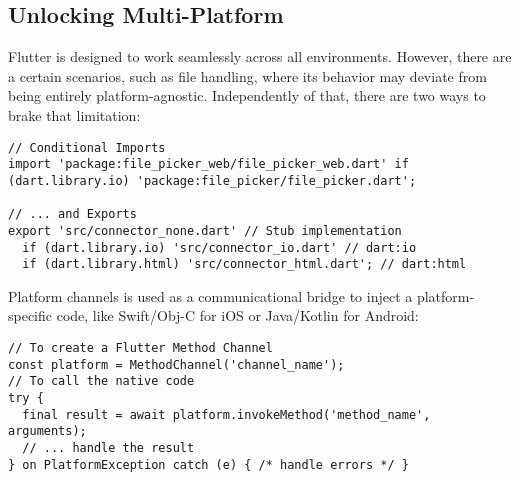 
\newpage
\subsection{Unlocking Multi-Platform}

Flutter is designed to work seamlessly across all environments. However, there are a certain scenarios, such as file
handling, where its behavior may deviate from being entirely platform-agnostic. Independently of that, there are two
ways to brake that limitation:

\begin{lstlisting}
// Conditional Imports
import 'package:file_picker_web/file_picker_web.dart' if (dart.library.io) 'package:file_picker/file_picker.dart';

// ... and Exports
export 'src/connector_none.dart' // Stub implementation
  if (dart.library.io) 'src/connector_io.dart' // dart:io
  if (dart.library.html) 'src/connector_html.dart'; // dart:html
\end{lstlisting}

\noindent Platform channels is used as a communicational bridge to inject a platform-specific code, like Swift/Obj-C 
for iOS or Java/Kotlin for Android:

\begin{lstlisting}
// To create a Flutter Method Channel
const platform = MethodChannel('channel_name');
// To call the native code
try {
  final result = await platform.invokeMethod('method_name', arguments);
  // ... handle the result
} on PlatformException catch (e) { /* handle errors */ }
\end{lstlisting}